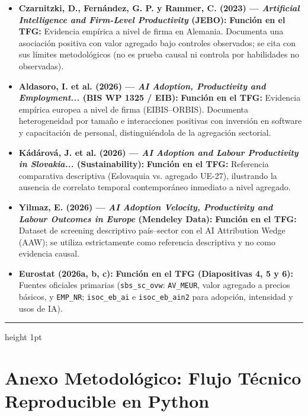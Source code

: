 \documentclass[11pt,a4paper]{article}
\begin{document}
\begin{itemize}[leftmargin=1.3em,itemsep=0.4em]
  \item \textbf{Czarnitzki, D., Fernández, G. P. y Rammer, C. (2023) — \textit{Artificial Intelligence and Firm-Level Productivity} (JEBO):}
  \textbf{Función en el TFG:} Evidencia empírica a nivel de firma en Alemania. Documenta una asociación positiva con valor agregado bajo controles observados; se cita con sus límites metodológicos (no es prueba causal ni controla por habilidades no observadas).

  \item \textbf{Aldasoro, I. et al. (2026) — \textit{AI Adoption, Productivity and Employment...} (BIS WP 1325 / EIB):}
  \textbf{Función en el TFG:} Evidencia empírica europea a nivel de firma (EIBIS--ORBIS). Documenta heterogeneidad por tamaño e interacciones positivas con inversión en software y capacitación de personal, distinguiéndola de la agregación sectorial.

  \item \textbf{Kádárová, J. et al. (2026) — \textit{AI Adoption and Labour Productivity in Slovakia...} (Sustainability):}
  \textbf{Función en el TFG:} Referencia comparativa descriptiva (Eslovaquia vs. agregado UE-27), ilustrando la ausencia de correlato temporal contemporáneo inmediato a nivel agregado.

  \item \textbf{Yilmaz, E. (2026) — \textit{AI Adoption Velocity, Productivity and Labour Outcomes in Europe} (Mendeley Data):}
  \textbf{Función en el TFG:} Dataset de screening descriptivo país--sector con el AI Attribution Wedge (AAW); se utiliza estrictamente como referencia descriptiva y no como evidencia causal.

  \item \textbf{Eurostat (2026a, b, c):}  
  \textbf{Función en el TFG (Diapositivas 4, 5 y 6):} Fuentes oficiales primarias (\texttt{sbs\_sc\_ovw}: \texttt{AV\_MEUR}, valor agregado a precios básicos, y \texttt{EMP\_NR}; \texttt{isoc\_eb\_ai} e \texttt{isoc\_eb\_ain2} para adopción, intensidad y usos de IA).
\end{itemize}

\vspace{0.6cm}
\hrule height 1pt
\vspace{0.6cm}

\section*{Anexo Metodológico: Flujo Técnico Reproducible en Python}
\end{document}
